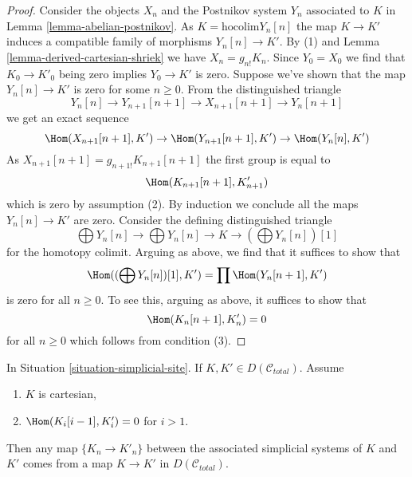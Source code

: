 \begin{proof}
Consider the objects $X_n$ and the Postnikov system $Y_n$
associated to $K$ in Lemma \ref{lemma-abelian-postnikov}.
As $K = \text{hocolim} Y_n[n]$ the map $K \to K'$ induces
a compatible family of morphisms $Y_n[n] \to K'$.
By (1) and Lemma \ref{lemma-derived-cartesian-shriek} we have
$X_n = g_{n!}K_n$. Since $Y_0 = X_0$ we find that
$K_0 \to K'_0$ being zero implies $Y_0 \to K'$ is zero.
Suppose we've shown that the map $Y_n[n] \to K'$ is zero
for some $n \geq 0$. From the distinguished triangle
$$
Y_n[n] \to Y_{n + 1}[n + 1] \to X_{n + 1}[n + 1] \to Y_n[n + 1]
$$
we get an exact sequence
$$
\Hom(X_{n + 1}[n + 1], K') \to
\Hom(Y_{n + 1}[n + 1], K') \to
\Hom(Y_n[n], K')
$$
As $X_{n + 1}[n + 1] = g_{n + 1!}K_{n + 1}[n + 1]$ the first group is equal to
$$
\Hom(K_{n + 1}[n + 1], K'_{n + 1})
$$
which is zero by assumption (2). By induction we conclude all the maps
$Y_n[n] \to K'$ are zero. Consider the defining distinguished triangle
$$
\bigoplus Y_n[n] \to
\bigoplus Y_n[n] \to
K \to
(\bigoplus Y_n[n])[1]
$$
for the homotopy colimit. Arguing as above, we find that it suffices
to show that
$$
\Hom((\bigoplus Y_n[n])[1], K') = \prod \Hom(Y_n[n + 1], K')
$$
is zero for all $n \geq 0$. To see this, arguing as above,
it suffices to show that
$$
\Hom(K_n[n + 1], K'_n)  = 0
$$
for all $n \geq 0$ which follows from condition (3).
\end{proof}

\begin{lemma}
\label{lemma-hom-cartesian-objects-derived}
In Situation \ref{situation-simplicial-site}.
If $K, K' \in D(\mathcal{C}_{total})$.
Assume
\begin{enumerate}
\item $K$ is cartesian,
\item $\Hom(K_i[i - 1], K'_i) = 0$ for $i > 1$.
\end{enumerate}
Then any map $\{K_n \to K'_n\}$ between the associated simplicial systems 
of $K$ and $K'$ comes from a map $K \to K'$ in $D(\mathcal{C}_{total})$.
\end{lemma}

